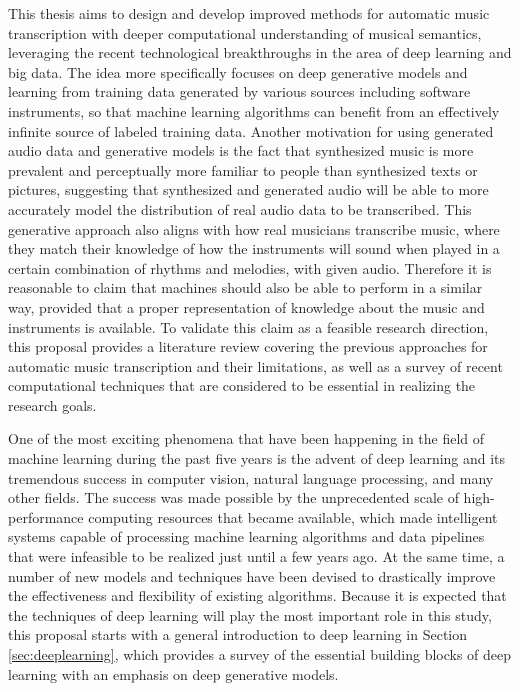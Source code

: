 This thesis aims to design and develop improved methods for automatic music transcription with deeper computational understanding of musical semantics, leveraging the recent technological breakthroughs in the area of deep learning and big data.
The idea more specifically focuses on deep generative models and learning from training data generated by various sources including software instruments, so that machine learning algorithms can benefit from an effectively infinite source of labeled training data.
Another motivation for using generated audio data and generative models is the fact that synthesized music is more prevalent and perceptually more familiar to people than synthesized texts or pictures, suggesting that synthesized and generated audio will be able to more accurately model the distribution of real audio data to be transcribed.
This generative approach also aligns with how real musicians transcribe music, where they match their knowledge of how the instruments will sound when played in a certain combination of rhythms and melodies, with given audio.
Therefore it is reasonable to claim that machines should also be able to perform in a similar way, provided that a proper representation of knowledge about the music and instruments is available.
To validate this claim as a feasible research direction, this proposal provides a literature review covering the previous approaches for automatic music transcription and their limitations, as well as a survey of recent computational techniques that are considered to be essential in realizing the research goals.


One of the most exciting phenomena that have been happening in the field of machine learning during the past five years is the advent of deep learning and its tremendous success in computer vision, natural language processing, and many other fields.
The success was made possible by the unprecedented scale of high-performance computing resources that became available, which made intelligent systems capable of processing machine learning algorithms and data pipelines that were infeasible to be realized just until a few years ago.
At the same time, a number of new models and techniques have been devised to drastically improve the effectiveness and flexibility of existing algorithms.
Because it is expected that the techniques of deep learning will play the most important role in this study, this proposal starts with a general introduction to deep learning in Section \ref{sec:deeplearning}, which provides a survey of the essential building blocks of deep learning with an emphasis on deep generative models.


